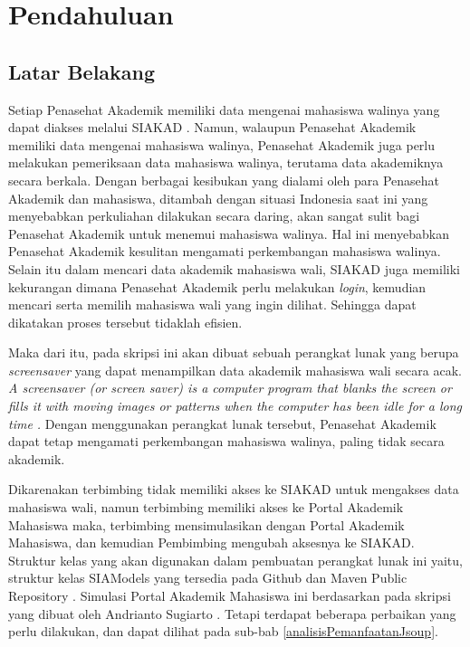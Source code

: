 \chapter{Pendahuluan}
\label{chap:intro}
   
\section{Latar Belakang}
\label{sec:label}

Setiap Penasehat Akademik memiliki data mengenai mahasiswa walinya yang dapat diakses melalui SIAKAD \cite{siakad}. Namun, walaupun Penasehat Akademik memiliki data mengenai mahasiswa walinya, Penasehat Akademik juga perlu melakukan pemeriksaan data mahasiswa walinya, terutama data akademiknya secara berkala. Dengan berbagai kesibukan yang dialami oleh para Penasehat Akademik dan mahasiswa, ditambah dengan situasi Indonesia saat ini yang menyebabkan perkuliahan dilakukan secara daring, akan sangat sulit bagi Penasehat Akademik untuk menemui mahasiswa walinya. Hal ini menyebabkan Penasehat Akademik kesulitan mengamati perkembangan mahasiswa walinya. Selain itu dalam mencari data akademik mahasiswa wali, SIAKAD juga memiliki kekurangan dimana Penasehat Akademik perlu melakukan \textit{login}, kemudian mencari serta memilih mahasiswa wali yang ingin dilihat. Sehingga dapat dikatakan proses tersebut tidaklah efisien.

Maka dari itu, pada skripsi ini akan dibuat sebuah perangkat lunak yang berupa \textit{screensaver} yang dapat menampilkan data akademik mahasiswa wali secara acak. \textit{A screensaver (or screen saver) is a computer program that blanks the screen or fills it with moving images or patterns when the computer has been idle for a long time \cite{screensaver}.} Dengan menggunakan perangkat lunak tersebut, Penasehat Akademik dapat tetap mengamati perkembangan mahasiswa walinya, paling tidak secara akademik.

Dikarenakan terbimbing tidak memiliki akses ke SIAKAD untuk mengakses data mahasiswa wali, namun terbimbing memiliki akses ke Portal Akademik Mahasiswa \cite{stupor} maka, terbimbing mensimulasikan dengan Portal Akademik Mahasiswa, dan kemudian Pembimbing mengubah aksesnya ke SIAKAD. Struktur kelas yang akan digunakan dalam pembuatan perangkat lunak ini yaitu, struktur kelas SIAModels yang tersedia pada Github dan Maven Public Repository \cite{siamodels}. Simulasi Portal Akademik Mahasiswa ini berdasarkan pada skripsi yang dibuat oleh Andrianto Sugiarto \cite{ifstupor}. Tetapi terdapat beberapa perbaikan yang perlu dilakukan, dan dapat dilihat pada sub-bab \ref{analisisPemanfaatanJsoup}.

